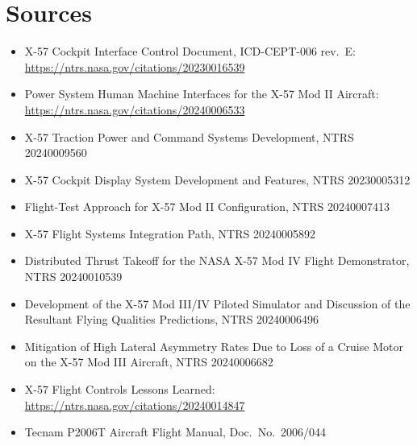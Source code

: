 \documentclass[11pt,a4paper,oneside]{book}
\begin{document}
\chapter{Sources}
\begin{itemize}
\item X-57 Cockpit Interface Control Document, ICD-CEPT-006 rev.~E: \url{https://ntrs.nasa.gov/citations/20230016539}
\item Power System Human Machine Interfaces for the X-57 Mod II Aircraft: \url{https://ntrs.nasa.gov/citations/20240006533}
\item X-57 Traction Power and Command Systems Development, NTRS 20240009560
\item X-57 Cockpit Display System Development and Features, NTRS 20230005312
\item Flight-Test Approach for X-57 Mod II Configuration, NTRS 20240007413
\item X-57 Flight Systems Integration Path, NTRS 20240005892
\item Distributed Thrust Takeoff for the NASA X-57 Mod IV Flight Demonstrator, NTRS 20240010539
\item Development of the X-57 Mod III/IV Piloted Simulator and Discussion of the Resultant Flying Qualities Predictions, NTRS 20240006496
\item Mitigation of High Lateral Asymmetry Rates Due to Loss of a Cruise Motor on the X-57 Mod III Aircraft, NTRS 20240006682
\item X-57 Flight Controls Lessons Learned: \url{https://ntrs.nasa.gov/citations/20240014847}
\item Tecnam P2006T Aircraft Flight Manual, Doc.\ No.\ 2006/044
\end{itemize}
\end{document}
